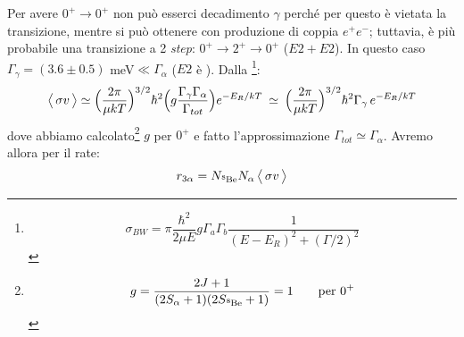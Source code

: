 \noindent Per avere $0^+\to0^+$ non può esserci decadimento $\gamma$ perché per questo è vietata la transizione, mentre si può ottenere con produzione di coppia $e^+e^-$; tuttavia, è più probabile una transizione a 2 \textit{step}: $0^+\to2^+\to0^+$ ($E2+E2$). In questo caso $\Gamma_\gamma = (3.6\pm 0.5)$ meV$\ll \Gamma_\alpha$ ($E2$ è ). Dalla \BW{}\footnote{$$\sigma_{BW} = \pi\frac{\hbar^2}{2\mu E}g\Gamma_a\Gamma_b \frac{1}{(E-E_R)^2+(\Gamma/2)^2}$$}:
%
$$\bigl\langle\, \sigma v\, \bigr\rangle \simeq \Bigl ( \frac{2\pi}{\mu kT} \Bigr )^{3/2} \hbar^2 \Bigl ( g \frac{\Gamma_\gamma\Gamma_\alpha}{\Gamma_{tot}} \Bigr ) e^{-E_R/kT}\: \simeq \: \Bigl ( \frac{2\pi}{\mu kT} \Bigr )^{3/2} \hbar^2 \Gamma_\gamma\, e^{-E_R/kT}$$
%
dove abbiamo calcolato\footnote{$$g=\frac{2J+1}{(2S_\alpha +1)(2S_{\ce{^8Be}}+1)} = 1 \qquad \text{per } 0^+$$} $g$ per $0^+$ e fatto l'approssimazione $\Gamma_{tot} \simeq \Gamma_\alpha$. Avremo allora per il rate:
$$r_{3\alpha} = N_{\ce{^8Be}}N_\alpha \, \mean{\sigma v}$$